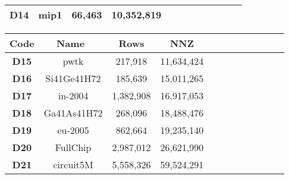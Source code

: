 \begin{table*}[ht]
{\begin{tabular}[t]{|cccc|cccc|cccc|}
        \textbf{D14}  & mip1                                   & 66,463        & 10,352,819    \\ \hline
    \end{tabular}
    \begin{tabular}[t]{|cccc|cccc|cccc|}
    \hline
        \textbf{Code} & \textbf{Name~\cite{davis2011university}} & \textbf{Rows} & \textbf{NNZ} \\ \hline
        \textbf{D15}  & pwtk                                   & 217,918       & 11,634,424    \\
        \textbf{D16}  & Si41Ge41H72                            & 185,639       & 15,011,265    \\
        \textbf{D17}  & in-2004                                & 1,382,908     & 16,917,053    \\
        \textbf{D18}  & Ga41As41H72                            & 268,096       & 18,488,476    \\
        \textbf{D19}  & eu-2005                                & 862,664       & 19,235,140    \\
        \textbf{D20}  & FullChip                               & 2,987,012     & 26,621,990    \\ 
        \textbf{D21}  & circuit5M                              & 5,558,326     & 59,524,291    \\ \hline
    \end{tabular}
    }
    \label{tab:matrxset}
\end{table*}
